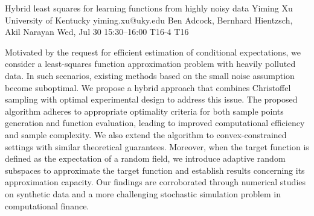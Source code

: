 \begin{talk}
  {Hybrid least squares for learning functions from highly noisy data}%
  {Yiming Xu}%
  {University of Kentucky}%
  {yiming.xu@uky.edu}%
  {Ben Adcock, Bernhard Hientzsch, Akil Narayan}%
  {}%
  {Wed, Jul 30 15:30–16:00}%
  {T16-4}%
  {T16}%
  
				
			
Motivated by the request for efficient estimation of conditional expectations, we consider a least-squares function approximation problem with heavily polluted data. In such scenarios, existing methods based on the small noise assumption become suboptimal. We propose a hybrid approach that combines Christoffel sampling with optimal experimental design to address this issue. The proposed algorithm adheres to appropriate optimality criteria for both sample points generation and function evaluation, leading to improved computational efficiency and sample complexity. We also extend the algorithm to convex-constrained settings with similar theoretical guarantees. Moreover, when the target function is defined as the expectation of a random field, we introduce adaptive random subspaces to approximate the target function and establish results concerning its approximation capacity. Our findings are corroborated through numerical studies on synthetic data and a more challenging stochastic simulation problem in computational finance.
\medskip

\end{talk}
